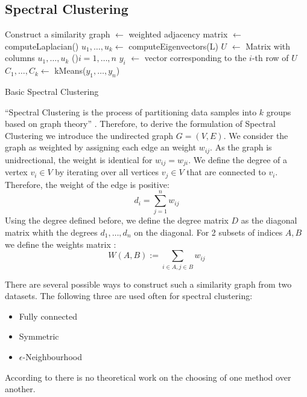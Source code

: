\subsection{Spectral Clustering}
\label{ssec:spectral_clustering}

\begin{algorithm}[h]
  Construct a similarity graph\;
  \Adj \(\leftarrow\) weighted adjacency matrix\;
  \Laplace \(\leftarrow\) computeLaplacian(\Adj)\;
  \(u_1, \ldots, u_k \leftarrow\) computeEigenvectors(L)\;
  \(U\) \(\leftarrow\) Matrix with columns \(u_1, \ldots, u_k\)\;
  \ForEach(){\(i = 1, \ldots, n\)}{
    \(y_i\) \(\leftarrow\) vector corresponding to the \(i\)-th row of \(U\)
  }
\(C_1, \ldots, C_k \leftarrow\) kMeans(\(y_1, \ldots, y_n\))\;

  \caption{Basic Spectral Clustering}\label{alg:basic_spectral}
 \end{algorithm}

\enquote{Spectral Clustering is the process of partitioning data samples into
\(k\) groups based on graph theory} \cite{krajsek_helmholtz_nodate}. Therefore,
to derive the formulation of Spectral Clustering we introduce the undirected graph \(G=(V, E)\).
We consider the graph as weighted by assigning each edge an weight \(w_{ij}\). As the graph
is unidrectional, the weight is identical for \(w_{ij} = w_{ji} \).
We define the degree of a vertex \(v_i \in V\) by iterating over all vertices \(v_j \in V\) that are connected to \(v_i\).
Therefore, the weight of the edge is positive:
\[d_i = \sum_{j=1}^n w_{ij}\]
Using the degree defined before, we define the degree matrix \(D\) as the diagonal matrix whith the degrees \(d_1, \ldots, d_n\) on the diagonal.
\cite{von_luxburg_tutorial_2007}
For 2 subsets of indices \(A, B\) we define the weights matrix \cite{von_luxburg_tutorial_2007}:
\[W(A, B) := \sum_{i \in A, j \in B} w_{ij}\]


There are several possible ways to construct such a similarity graph from two datasets.
The following three are used often for spectral clustering:
\begin{itemize}
  \item Fully connected
  \item Symmetric
  \item \(\epsilon\)-Neighbourhood
\end{itemize}
According to \cite{von_luxburg_tutorial_2007} there is no theoretical work on the choosing of one method over
another.

